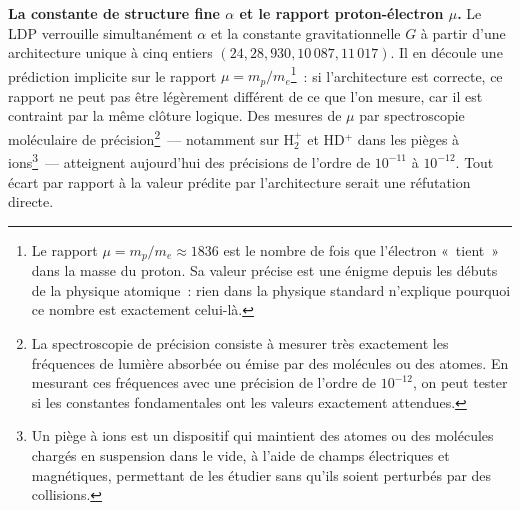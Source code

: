\documentclass[12pt, a4paper, openright]{book}
\begin{document}
\textbf{La constante de structure fine $\alpha$ et le rapport proton-électron $\mu$.} Le LDP verrouille simultanément $\alpha$ et la constante gravitationnelle $G$ à partir d'une architecture unique à cinq entiers $(24, 28, 930, 10\,087, 11\,017)$. Il en découle une prédiction implicite sur le rapport $\mu = m_p / m_e$\footnote{Le rapport $\mu = m_p/m_e \approx 1836$ est le nombre de fois que l'électron «~tient~» dans la masse du proton. Sa valeur précise est une énigme depuis les débuts de la physique atomique~: rien dans la physique standard n'explique pourquoi ce nombre est exactement celui-là.}~: si l'architecture est correcte, ce rapport ne peut pas être légèrement différent de ce que l'on mesure, car il est contraint par la même clôture logique. Des mesures de $\mu$ par spectroscopie moléculaire de précision\footnote{La spectroscopie de précision consiste à mesurer très exactement les fréquences de lumière absorbée ou émise par des molécules ou des atomes. En mesurant ces fréquences avec une précision de l'ordre de $10^{-12}$, on peut tester si les constantes fondamentales ont les valeurs exactement attendues.}~--- notamment sur H$_2^+$ et HD$^+$ dans les pièges à ions\footnote{Un piège à ions est un dispositif qui maintient des atomes ou des molécules chargés en suspension dans le vide, à l'aide de champs électriques et magnétiques, permettant de les étudier sans qu'ils soient perturbés par des collisions.}~--- atteignent aujourd'hui des précisions de l'ordre de $10^{-11}$ à $10^{-12}$. Tout écart par rapport à la valeur prédite par l'architecture serait une réfutation directe.

\medskip
\end{document}
